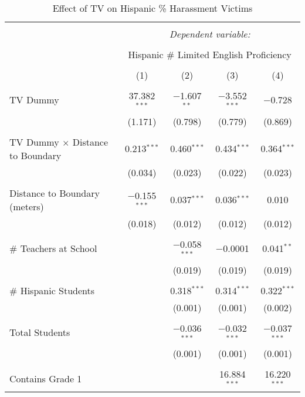 
\begin{table}[!htbp] \centering 
  \caption{Effect of TV on Hispanic \% Harassment Victims} 
  \label{} 
\begin{tabular}{@{\extracolsep{-2pt}}lcccc} 
\\[-1.8ex]\hline 
\hline \\[-1.8ex] 
 & \multicolumn{4}{c}{\textit{Dependent variable:}} \\ 
\cline{2-5} 
\\[-1.8ex] & \multicolumn{4}{c}{Hispanic \# Limited English Proficiency} \\ 
\\[-1.8ex] & (1) & (2) & (3) & (4)\\ 
\hline \\[-1.8ex] 
 TV Dummy & 37.382$^{***}$ & $-$1.607$^{**}$ & $-$3.552$^{***}$ & $-$0.728 \\ 
  & (1.171) & (0.798) & (0.779) & (0.869) \\ 
  & & & & \\ 
 TV Dummy $\times$ Distance to Boundary & 0.213$^{***}$ & 0.460$^{***}$ & 0.434$^{***}$ & 0.364$^{***}$ \\ 
  & (0.034) & (0.023) & (0.022) & (0.023) \\ 
  & & & & \\ 
 Distance to Boundary (meters) & $-$0.155$^{***}$ & 0.037$^{***}$ & 0.036$^{***}$ & 0.010 \\ 
  & (0.018) & (0.012) & (0.012) & (0.012) \\ 
  & & & & \\ 
 \# Teachers at School &  & $-$0.058$^{***}$ & $-$0.0001 & 0.041$^{**}$ \\ 
  &  & (0.019) & (0.019) & (0.019) \\ 
  & & & & \\ 
 \# Hispanic Students &  & 0.318$^{***}$ & 0.314$^{***}$ & 0.322$^{***}$ \\ 
  &  & (0.001) & (0.001) & (0.002) \\ 
  & & & & \\ 
 Total Students &  & $-$0.036$^{***}$ & $-$0.032$^{***}$ & $-$0.037$^{***}$ \\ 
  &  & (0.001) & (0.001) & (0.001) \\ 
  & & & & \\ 
 Contains Grade 1 &  &  & 16.884$^{***}$ & 16.220$^{***}$ \\ 

\end{tabular}
\end{table}
